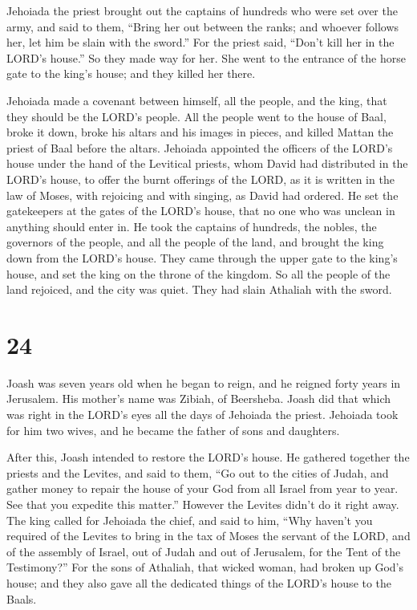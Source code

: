 Jehoiada the priest brought out the captains of hundreds
who were set over the army, and said to them, ``Bring her out between
the ranks; and whoever follows her, let him be slain with the sword.''
For the priest said, ``Don't kill her in the LORD's house.''
 So they made way for her. She went to the entrance of
the horse gate to the king's house; and they killed her there.

 Jehoiada made a covenant between himself, all the
people, and the king, that they should be the LORD's people.
 All the people went to the house of Baal, broke it down,
broke his altars and his images in pieces, and killed Mattan the priest
of Baal before the altars.  Jehoiada appointed the
officers of the LORD's house under the hand of the Levitical priests,
whom David had distributed in the LORD's house, to offer the burnt
offerings of the LORD, as it is written in the law of Moses, with
rejoicing and with singing, as David had ordered.  He set
the gatekeepers at the gates of the LORD's house, that no one who was
unclean in anything should enter in.  He took the
captains of hundreds, the nobles, the governors of the people, and all
the people of the land, and brought the king down from the LORD's house.
They came through the upper gate to the king's house, and set the king
on the throne of the kingdom.  So all the people of the
land rejoiced, and the city was quiet. They had slain Athaliah with the
sword.

\hypertarget{section-23}{%
\section{24}\label{section-23}}

 Joash was seven years old when he began to reign, and he
reigned forty years in Jerusalem. His mother's name was Zibiah, of
Beersheba.  Joash did that which was right in the LORD's
eyes all the days of Jehoiada the priest.  Jehoiada took
for him two wives, and he became the father of sons and daughters.

 After this, Joash intended to restore the LORD's house.
 He gathered together the priests and the Levites, and
said to them, ``Go out to the cities of Judah, and gather money to
repair the house of your God from all Israel from year to year. See that
you expedite this matter.'' However the Levites didn't do it right away.
 The king called for Jehoiada the chief, and said to him,
``Why haven't you required of the Levites to bring in the tax of Moses
the servant of the LORD, and of the assembly of Israel, out of Judah and
out of Jerusalem, for the Tent of the Testimony?''  For
the sons of Athaliah, that wicked woman, had broken up God's house; and
they also gave all the dedicated things of the LORD's house to the
Baals.

